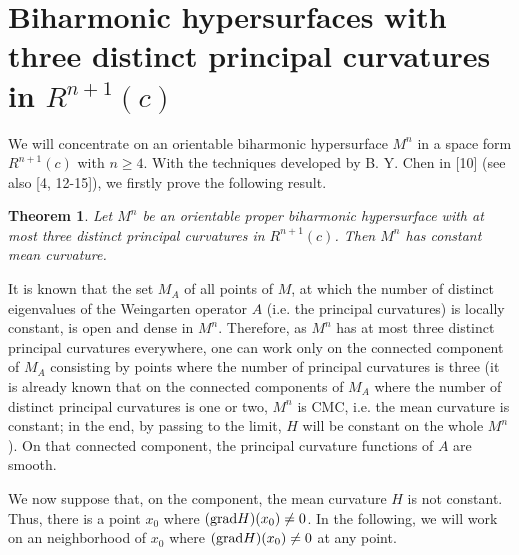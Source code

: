 \documentclass[twoside,reqno,A4]{amsart}
\newtheorem{theorem}{Theorem}[section]
\theoremstyle{definition}
\theoremstyle{remark}
\numberwithin{equation}{section}
\begin{document}
\section{Biharmonic hypersurfaces with three distinct principal curvatures in $ R^{n+1}(c)$}
We will concentrate on an orientable biharmonic hypersurface $M^n$
in a space form $R^{n+1}(c)$ with $n\geq4$. With the techniques
developed by B. Y. Chen in [10] (see also [4, 12-15]), we firstly
prove the following result.
\begin{theorem}
Let $M^n$ be an orientable proper biharmonic hypersurface with at
most three distinct principal curvatures in $R^{n+1}(c)$. Then $M^n$
has constant mean curvature.
\end{theorem}
It is known that the set $M_A$ of all points of $M$, at which the
number of distinct eigenvalues of the Weingarten operator $A$ (i.e.
the principal curvatures) is locally constant, is open and dense in
$M^n$. Therefore, as $M^n$ has at most three distinct principal
curvatures everywhere, one can work only on the connected component
of $M_A$ consisting by points where the number of principal
curvatures is three (it is already known that on the connected
components of $M_A$ where the number of distinct principal
curvatures is one or two, $M^n$ is CMC, i.e. the mean curvature is
constant; in the end, by passing to the limit, $H$ will be constant
on the whole $M^n$). On that connected component, the principal
curvature functions of $A$ are smooth.

We now suppose that, on the component, the mean curvature $H$ is not
constant. Thus, there is a point $x_0$ where $({\rm
grad}H)(x_0)\neq0$. In the following, we will work on an
neighborhood of $x_0$ where $({\rm grad}H)(x_0)\neq0$ at any point.
\end{document}
